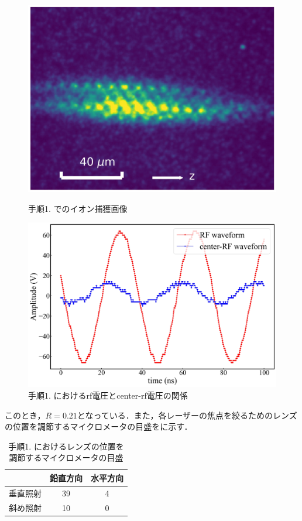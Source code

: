 \begin{enumerate}
\begin{figure}[h]
	\begin{minipage}{0.48\linewidth}
	\begin{center}
		\includegraphics[width = 0.6\columnwidth]{./methods/figure/1_2D.jpg}
		\caption{手順1. でのイオン捕獲画像}
		\label{fig:1_2D}
	\end{center}
	\end{minipage}
	\begin{minipage}{0.48\linewidth}
		\begin{center}
			\includegraphics[width = 0.9\columnwidth]{./methods/figure/1_2D_wave.jpg}
			\caption{手順1. におけるrf電圧とcenter-rf電圧の関係}
			\label{fig:1_2D_wave}
		\end{center}
	\end{minipage}
\end{figure}

このとき，$R=0.21$となっている．また，各レーザーの焦点を絞るためのレンズの位置を調節するマイクロメータの目盛をに示す．

\begin{table}[h]
	\begin{center}
	\caption{手順1. におけるレンズの位置を調節するマイクロメータの目盛}
	\label{tab:1_2D}
	\begin{tabular}{c|cc} \hline \hline
		&鉛直方向&水平方向 \\ \hline
		垂直照射&39 & 4 \\ 
		斜め照射&10 & 0 \\ \hline
	\end{tabular}
	\end{center}
\end{table}


\end{enumerate}
